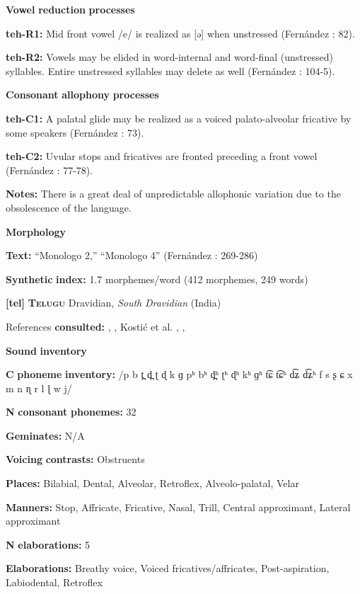 \begin{styleBody}
\textbf{Vowel} \textbf{reduction} \textbf{processes}

\textbf{teh-R1:} Mid front vowel /e/ is realized as [ə] when unstressed (Fernández \citealt{Garay1998}: 82).

\textbf{teh-R2:} Vowels may be elided in word-internal and word-final (unstressed) syllables. Entire unstressed syllables may delete as well (Fernández \citealt{Garay1998}: 104-5).

\textbf{Consonant} \textbf{allophony} \textbf{processes}

\textbf{teh-C1:} A palatal glide may be realized as a voiced palato-alveolar fricative by some speakers (Fernández \citealt{Garay1998}: 73).

\textbf{teh-C2:} Uvular stops and fricatives are fronted preceding a front vowel (Fernández \citealt{Garay1998}: 77-78).

\textbf{Notes:} There is a great deal of unpredictable allophonic variation due to the obsolescence of the language.

\textbf{Morphology}

\textbf{Text:} “Monologo 2,” “Monologo 4” (Fernández \citealt{GarayHernández2006}: 269-286)

\textbf{Synthetic} \textbf{index:} 1.7 morphemes/word (412 morphemes, 249 words)

\textbf{[tel]}   \textbf{\textsc{Telugu}}    Dravidian, \textit{South} \textit{Dravidian} (India)

References \textbf{consulted:} \citet{BhaskararaoRay2017}, \citet{Kelley1963}, Kostić et al. , \citet{Krishnamurti1998}, \citet{Sailaja1999}

\textbf{Sound} \textbf{inventory}

\textbf{C} \textbf{phoneme} \textbf{inventory:} /p b t̪ d̪ ʈ ɖ k ɡ pʰ bʰ d̪ʰ ʈʰ ɖʰ kʰ ɡʰ t͡ɕ t͡ɕʰ d͡ʑ d͡ʑʰ f s ʂ ɕ x m n ɳ r l ɭ w j/

\textbf{N} \textbf{consonant} \textbf{phonemes:} 32

\textbf{Geminates:} N/A

\textbf{Voicing} \textbf{contrasts:} Obstruents

\textbf{Places:} Bilabial, Dental, Alveolar, Retroflex, Alveolo-palatal, Velar

\textbf{Manners:} Stop, Affricate, Fricative, Nasal, Trill, Central approximant, Lateral approximant

\textbf{N} \textbf{elaborations:} 5

\textbf{Elaborations:} Breathy voice, Voiced fricatives/affricates, Post-aspiration, Labiodental, Retroflex


\end{styleBody}
